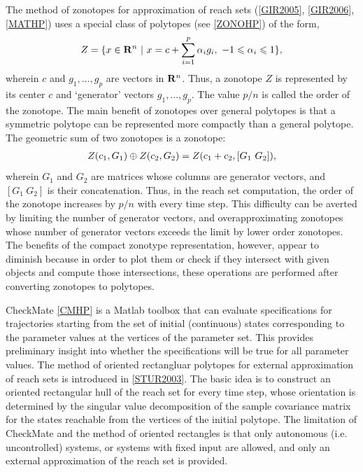 \documentclass[letterpaper,10pt,english]{sphinxmanual}
\begin{document}
The method of zonotopes for approximation of reach sets ({\hyperref[chap_intro:gir2005]{{[}GIR2005{]}}}, {\hyperref[chap_intro:gir2006]{{[}GIR2006{]}}}, {\hyperref[chap_intro:mathp]{{[}MATHP{]}}})
uses a special class of polytopes (see {\hyperref[chap_intro:zonohp]{{[}ZONOHP{]}}})
of the form,
\begin{gather}
\begin{split}Z=\{x \in {\bf R}^n ~|~
x=c+\sum_{i=1}^p\alpha_ig_i,~ -1\leqslant\alpha_i\leqslant1\},\end{split}\notag
\end{gather}
wherein \(c\) and \(g_1, ..., g_p\) are vectors in
\({\bf R}^n\). Thus, a zonotope \(Z\) is represented by its
center \(c\) and ‘generator’ vectors \(g_1, ..., g_p\). The
value \(p/n\) is called the order of the zonotope. The main benefit
of zonotopes over general polytopes is that a symmetric polytope can be
represented more compactly than a general polytope. The geometric sum of
two zonotopes is a zonotope:
\begin{gather}
\begin{split}Z(c_1, G_1)\oplus Z(c_2, G_2) = Z(c_1+c_2, [G_1 ~ G_2]),\end{split}\notag
\end{gather}
wherein \(G_1\) and \(G_2\) are matrices whose columns are
generator vectors, and \([G_1 ~ G_2]\) is their concatenation. Thus,
in the reach set computation, the order of the zonotope increases by
\(p/n\) with every time step. This difficulty can be averted by
limiting the number of generator vectors, and overapproximating
zonotopes whose number of generator vectors exceeds the limit by lower
order zonotopes. The benefits of the compact zonotype representation,
however, appear to diminish because in order to plot them or check if
they intersect with given objects and compute those intersections, these
operations are performed after converting zonotopes to polytopes.

CheckMate {\hyperref[chap_intro:cmhp]{{[}CMHP{]}}} is a Matlab toolbox that can evaluate
specifications for trajectories starting from the set of initial
(continuous) states corresponding to the parameter values at the
vertices of the parameter set. This provides preliminary insight into
whether the specifications will be true for all parameter values. The
method of oriented rectangluar polytopes for external approximation of
reach sets is introduced in {\hyperref[chap_intro:stur2003]{{[}STUR2003{]}}}. The basic idea
is to construct an oriented rectangular hull of the reach set for every
time step, whose orientation is determined by the singular value
decomposition of the sample covariance matrix for the states reachable
from the vertices of the initial polytope. The limitation of CheckMate
and the method of oriented rectangles is that only autonomous (i.e.
uncontrolled) systems, or systems with fixed input are allowed, and only
an external approximation of the reach set is provided.
\end{document}

